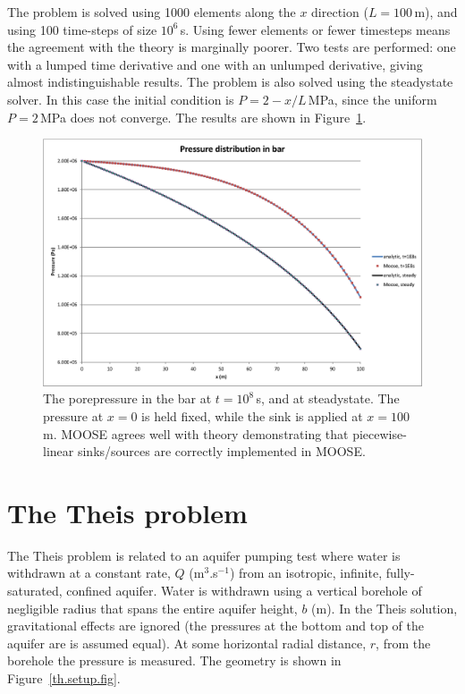\documentclass[]{scrreprt}
\begin{document}
The problem is solved using 1000 elements along the $x$ direction
($L=100$\,m), and using 100 time-steps of size $10^6$\,s.  Using fewer
elements or fewer timesteps means the agreement with the theory is
marginally poorer.  Two tests are performed: one with a lumped time
derivative and one with an unlumped derivative, giving almost
indistinguishable results.  The problem is also
solved using the steadystate solver.  In this case the initial
condition is $P=2-x/L$\,MPa, since the uniform $P=2$\,MPa does not
converge.  The results are shown in Figure~\ref{nc.fig}.

\begin{figure}[htb]
\begin{center}
\includegraphics[width=17cm]{nc.eps}
\caption{The porepressure in the bar at $t=10^{8}$\,s, and at
  steadystate.  The pressure at $x=0$ is held fixed, while the sink is
  applied at $x=100$\,m.  MOOSE agrees well with theory demonstrating
  that piecewise-linear sinks/sources are correctly implemented in MOOSE.}
\label{nc.fig}
\end{center}
\end{figure}


\chapter{The Theis problem}
\label{th}

The Theis problem is related to an aquifer pumping test where water is
withdrawn at a constant rate, $Q$ (m$^{3}$.s$^{-1}$) from an
isotropic, infinite, fully-saturated, confined aquifer.  Water is withdrawn
using a vertical borehole of negligible radius that spans the entire
aquifer height, $b$ (m).  In the Theis solution, gravitational
effects are ignored (the pressures at the bottom and top of the
aquifer are is assumed equal).  At some horizontal radial distance, $r$, from
the borehole the pressure is measured.  The geometry is shown in
Figure~\ref{th.setup.fig}. 
\end{document}
